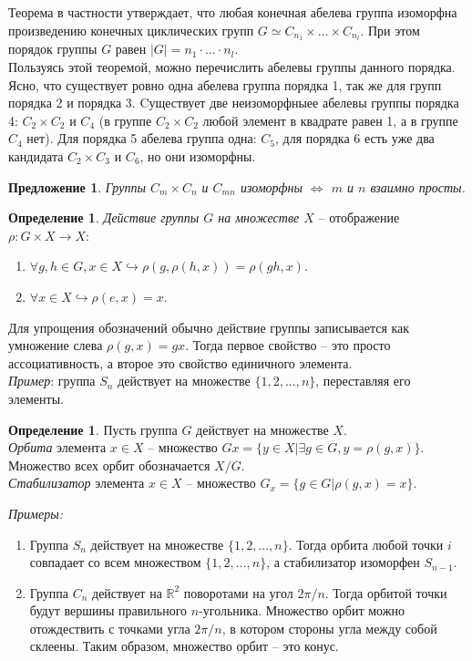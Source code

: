 \documentclass[12pt]{article}
\newtheorem{predl}[theorem]{Предложение}
\theoremstyle{definition}
\newtheorem{defin}[theorem]{Определение}
\begin{document}
Теорема в частности утверждает, что любая конечная абелева группа изоморфна произведению конечных циклических групп $G\simeq C_{n_1}\times...\times C_{n_l}$. При этом порядок группы $G$ равен $|G| = n_1\cdot...\cdot n_l$.\\
Пользуясь этой теоремой, можно перечислить абелевы группы данного порядка. Ясно, что существует ровно одна абелева группа порядка 1, так же для групп порядка 2 и порядка 3. Cуществует две неизоморфныее
абелевы группы порядка 4: $C_2\times C_2$ и $C_4$ (в группе $C_2\times C_2$ любой элемент в квадрате равен 1, а в группе $C_4$ нет). Для порядка 5 абелева группа одна: $C_5$, для
порядка 6 есть уже два кандидата $C_2\times C_3$ и $C_6$, но они изоморфны.
\begin{predl}
    Группы $C_m \times C_n$ и $C_{mn}$ изоморфны $\Leftrightarrow$ $m$ и $n$ взаимно просты.
\end{predl}
\begin{defin}
\textit{Действие группы $G$ на множестве $X$} -- отображение $\rho:G\times X\rightarrow X$:
\begin{enumerate}
    \item $\forall g,h\in G, x\in X\hookrightarrow\rho(g,\rho(h,x))=\rho(gh,x)$.
    \item $\forall x\in X\hookrightarrow\rho(e,x)=x$.
\end{enumerate}
\end{defin}
Для упрощения обозначений обычно действие группы записывается как умножение слева $\rho(g,x)=gx$. Тогда первое свойство -- это просто ассоциативность, а второе это свойство единичного элемента.\\
\textit{Пример}: группа $S_n$ действует на множестве $\{1,2,...,n\}$, переставляя его элементы.
\begin{defin}
Пусть группа $G$ действует на множестве $X$.\\
\textit{Орбита} элемента $x\in X$ -- множество $Gx=\{y\in X|\exists g\in G, y=\rho(g,x)\}$. Множество всех орбит обозначается $X/G$.\\
\textit{Стабилизатор} элемента $x\in X$ -- множество $G_x=\{g\in G|\rho(g,x)=x\}$.
\end{defin}
\textit{Примеры:}
\begin{enumerate}
    \item Группа $S_n$ действует на множестве $\{1,2,...,n\}$. Тогда орбита любой точки $i$ совпадает со всем множеством $\{1,2,...,n\}$, а стабилизатор изоморфен $S_{n-1}$.
    \item Группа $C_n$ действует на $\mathbb{R}^2$ поворотами на угол $2\pi/n$. Тогда орбитой точки будут вершины правильного $n$-угольника. Множество орбит можно отождествить с точками угла $2\pi/n$, в котором стороны угла между собой склеены. Таким образом, множество орбит -- это конус.
\end{enumerate}
\end{document}
